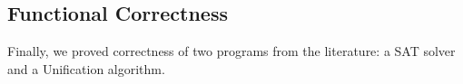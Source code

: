 


\subsection{Functional Correctness} \label{subsec:programs}

Finally, we proved correctness of two programs
from the literature: a SAT solver and a Unification
algorithm.

